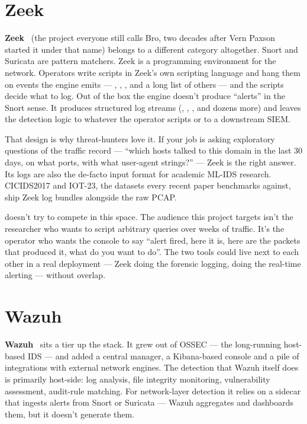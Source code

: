 \section{Zeek}
\label{sec:rw-zeek}

\textbf{Zeek}~\cite{paxson1999bro} (the project everyone still
calls Bro, two decades after Vern Paxson started it under that
name) belongs to a different category altogether. Snort and
Suricata are pattern matchers. Zeek is a programming environment
for the network. Operators write scripts in Zeek's own scripting
language and hang them on events the engine emits ---
, ,
, and a long list of others --- and the
scripts decide what to log. Out of the box the engine doesn't
produce ``alerts'' in the Snort sense. It produces structured
log streams (, , ,
and dozens more) and leaves the detection logic to whatever the
operator scripts or to a downstream SIEM.

That design is why threat-hunters love it. If your job is asking
exploratory questions of the traffic record --- ``which hosts
talked to this domain in the last 30 days, on what ports, with
what user-agent strings?'' --- Zeek is the right answer. Its
logs are also the de-facto input format for academic ML-IDS
research. CICIDS2017 and IOT-23, the datasets every recent
paper benchmarks against, ship Zeek log bundles alongside the
raw PCAP.

\nidsname{} doesn't try to compete in this space. The audience
this project targets isn't the researcher who wants to script
arbitrary queries over weeks of traffic. It's the operator who
wants the console to say ``alert fired, here it is, here are
the packets that produced it, what do you want to do''. The two
tools could live next to each other in a real deployment ---
Zeek doing the forensic logging, \nidsname{} doing the
real-time alerting --- without overlap.

\section{Wazuh}
\label{sec:rw-wazuh}

\textbf{Wazuh}~\cite{wazuh} sits a tier up the stack. It
grew out of OSSEC --- the long-running host-based IDS --- and
added a central manager, a Kibana-based console and a pile of
integrations with external network engines. The detection that
Wazuh itself does is primarily host-side: log analysis, file
integrity monitoring, vulnerability assessment, audit-rule
matching. For network-layer detection it relies on a sidecar
that ingests alerts from Snort or Suricata --- Wazuh aggregates
and dashboards them, but it doesn't generate them.

